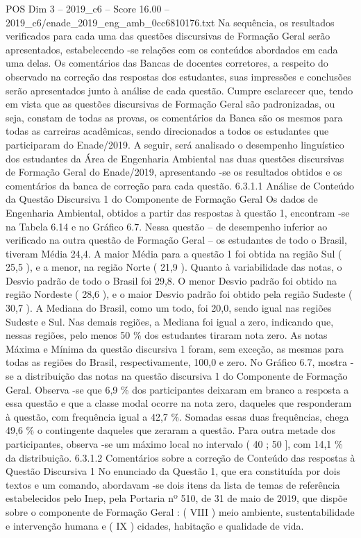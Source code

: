 \begin{textsample}{POS Dim 3 – 2019\_c6 – Score 16.00 – 2019\_c6/enade\_2019\_eng\_amb\_0cc6810176.txt}
Na sequência, os resultados verificados para cada uma das questões discursivas de Formação Geral serão apresentados, estabelecendo -se relações com os conteúdos abordados em cada uma delas.
Os comentários das Bancas de docentes corretores, a respeito do observado na correção das respostas dos estudantes, suas impressões e conclusões serão apresentados junto à análise de cada questão.
Cumpre esclarecer que, tendo em vista que as questões discursivas de Formação Geral são padronizadas, ou seja, constam de todas as provas, os comentários da Banca são os mesmos para todas as carreiras acadêmicas, sendo direcionados a todos os estudantes que participaram do Enade/2019.
A seguir, será analisado o desempenho linguístico dos estudantes da Área de Engenharia Ambiental nas duas questões discursivas de Formação Geral do Enade/2019, apresentando -se os resultados obtidos e os comentários da banca de correção para cada questão. 6.3.1.1 Análise de Conteúdo da Questão Discursiva 1 do Componente de Formação Geral Os dados de Engenharia Ambiental, obtidos a partir das respostas à questão 1, encontram -se na Tabela 6.14 e no Gráfico 6.7.
Nessa questão – de desempenho inferior ao verificado na outra questão de Formação Geral – os estudantes de todo o Brasil, tiveram Média 24,4.
A maior Média para a questão 1 foi obtida na região Sul ( 25,5 ), e a menor, na região Norte ( 21,9 ).
Quanto à variabilidade das notas, o Desvio padrão de todo o Brasil foi 29,8.
O menor Desvio padrão foi obtido na região Nordeste ( 28,6 ), e o maior Desvio padrão foi obtido pela região Sudeste ( 30,7 ).
A Mediana do Brasil, como um todo, foi 20,0, sendo igual nas regiões Sudeste e Sul.
Nas demais regiões, a Mediana foi igual a zero, indicando que, nessas regiões, pelo menos 50 \% dos estudantes tiraram nota zero.
As notas Máxima e Mínima da questão discursiva 1 foram, sem exceção, as mesmas para todas as regiões do Brasil, respectivamente, 100,0 e zero.
No Gráfico 6.7, mostra -se a distribuição das notas na questão discursiva 1 do Componente de Formação Geral.
Observa -se que 6,9 \% dos participantes deixaram em branco a resposta a essa questão e que a classe modal ocorre na nota zero, daqueles que responderam à questão, com frequência igual a 42,7 \%.
Somadas essas duas frequências, chega 49,6 \% o contingente daqueles que zeraram a questão.
Para outra metade dos participantes, observa -se um máximo local no intervalo ( 40 ; 50 ], com 14,1 \% da distribuição. 6.3.1.2 Comentários sobre a correção de Conteúdo das respostas à Questão Discursiva 1 No enunciado da Questão 1, que era constituída por dois textos e um comando, abordavam -se dois itens da lista de temas de referência estabelecidos pelo Inep, pela Portaria nº 510, de 31 de maio de 2019, que dispõe sobre o componente de Formação Geral : ( VIII ) meio ambiente, sustentabilidade e intervenção humana e ( IX ) cidades, habitação e qualidade de vida.

\end{textsample}

